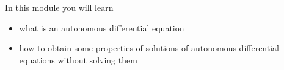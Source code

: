 In this module you will learn
\begin{itemize}
	\item what is an autonomous differential equation
	\item how to obtain some properties of solutions of autonomous differential equations without solving them
\end{itemize}

\hfill \\


